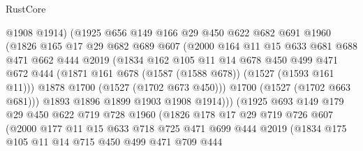 \begin{lexlean}{RustCore}
\begin{coremodule}
                    @1908
                    @1914)
                  (@1925
                    @656
                    @149
                    @166
                    @29
                    @450
                    @622
                    @682
                    @691
                    @1960
                    (@1826
                      @165
                      @17
                      @29
                      @682
                      @689
                      @607
                      (@2000
                        @164
                        @11
                        @15
                        @633
                        @681
                        @688
                        @471
                        @662
                        @444
                        @2019
                        (@1834
                          @162
                          @105
                          @11
                          @14
                          @678
                          @450
                          @499
                          @471
                          @672
                          @444
                          (@1871 @161 @678 (@1587 (@1588 @678)) (@1527 (@1593 @161 @11)))
                          @1878
                          @1700
                          (@1527 (@1702 @673 @450)))
                        @1700
                        (@1527 (@1702 @663 @681)))
                      @1893
                      @1896
                      @1899
                      @1903
                      @1908
                      @1914)))
                (@1925
                  @693
                  @149
                  @179
                  @29
                  @450
                  @622
                  @719
                  @728
                  @1960
                  (@1826
                    @178
                    @17
                    @29
                    @719
                    @726
                    @607
                    (@2000
                      @177
                      @11
                      @15
                      @633
                      @718
                      @725
                      @471
                      @699
                      @444
                      @2019
                      (@1834
                        @175
                        @105
                        @11
                        @14
                        @715
                        @450
                        @499
                        @471
                        @709
                        @444

\end{coremodule}
\end{lexlean}
